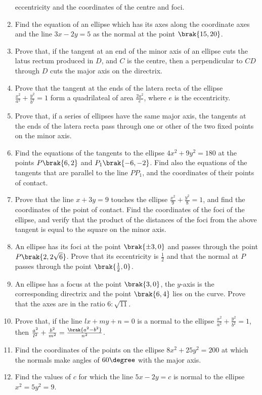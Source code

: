 \begin{enumerate}[1.]
eccentricity and the coordinates of the centre and foci.
\item Find the equation of an ellipse which has its axes along the coordinate
axes and the line $3x-2y=5$ as the normal at the point $\brak{15,20}$.  
\item Prove that, if the tangent at an end of the minor axis of an
ellipse cuts the latus rectum produced in $D$, and $C$ is the centre,
then a perpendicular to $CD$ through $D$ cuts the major axis on the directrix.
\item Prove that the tangent at the ends of the latera recta of the ellipse $\frac{x^2}{a^2}+\frac{y^2}{b^2}=1$
form a quadrilateal of area $\frac{2a^2}{e}$, where $e$ is the eccentricity.  
\item Prove that, if a series of ellipses have the same major axis, the tangents
at the ends of the latera recta pass through one or other of the two fixed points
on the minor axis.
\item Find the equations of the tangents to the ellipse $4x^2+9y^2 = 180$ at the
points $P \brak{6,2}$ and $P_1 \brak{-6,-2}$.  Find also the equations of the
tangents that are parallel to the line $PP_1$, and the coordinates of their points
of contact.
\item Prove that the line $x+3y=9$ touches the ellipse $\frac{x^2}{9} + \frac{y^2}{8} =1$,
and find the coordinates of the point of contact.  Find the coordinates of the foci of the ellipse,
and verify that the product of the distances of the foci from the above tangent is equal to the
square on the minor axis.
\item An ellipse has its foci at the point $\brak{\pm 3,0}$ and passes through
the point $P \brak{2,2\sqrt{6}}$.  Prove that its eccentricity is $\frac{1}{2}$ and
that the normal at $P$ passes through the point $\brak{\frac{1}{2},0}$.
\item An ellipse has a focus at the point $\brak{3,0}$, the $y$-axis is the corresponding
directrix and the point $\brak{6,4}$ lies on the curve.  Prove that the axes are in the
ratio $6:\sqrt{11}$.  
\item Prove that, if the line $lx+my+n=0$ is a normal to the ellipse $\frac{x^2}{a^2}+\frac{y^2}{b^2}=1$,
then $\frac{a^2}{l^2}+\frac{b^2}{m^2} = \frac{\brak{a^2-b^2}}{n^2}$.
\item Find the coordinates of the points on the ellipse $8x^2+25y^2 = 200$ at which the normals
make angles of $60\degree$ with the major axis.
\item Find the values of $c$ for which the line $5x-2y=c$ is normal to the ellipse $x^2=5y^2=9$.

\end{enumerate}
